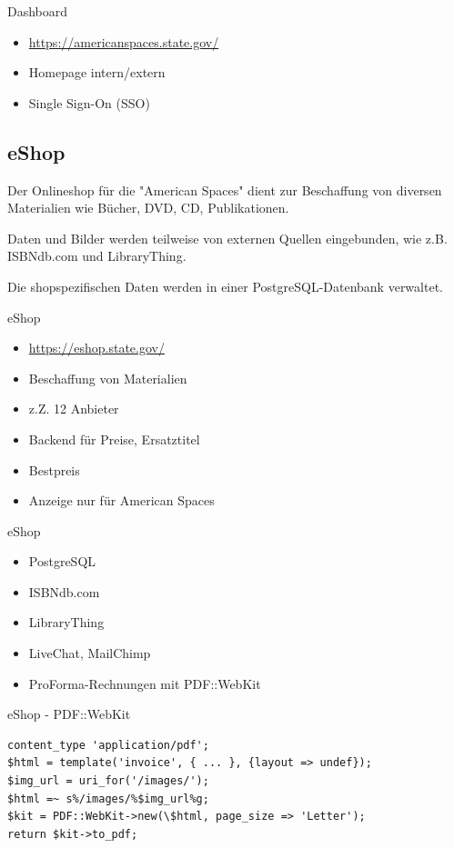 \begin{frame}{Dashboard}
\begin{itemize}
\item \url{https://americanspaces.state.gov/}
\item Homepage intern/extern
\item Single Sign-On (SSO)
\end{itemize}
\end{frame}
    
\subsection{eShop}

Der Onlineshop für die "American Spaces" dient zur Beschaffung von
diversen Materialien wie Bücher, DVD, CD, Publikationen.

Daten und Bilder werden teilweise von externen Quellen eingebunden,
wie z.B. ISBNdb.com und LibraryThing.

Die shopspezifischen Daten werden in einer PostgreSQL-Datenbank
verwaltet.

\begin{frame}{eShop}
\begin{itemize}
\item \url{https://eshop.state.gov/}
\item Beschaffung von Materialien
\item z.Z. 12 Anbieter
\item Backend für Preise, Ersatztitel
\item Bestpreis
\item Anzeige nur für American Spaces
\end{itemize}
\end{frame}

\begin{frame}{eShop}
\begin{itemize}
\item PostgreSQL
\item ISBNdb.com
\item LibraryThing
\item LiveChat, MailChimp
\item ProForma-Rechnungen mit PDF::WebKit
\end{itemize}
\end{frame}
    
\begin{frame}[fragile]{eShop - PDF::WebKit}
\begin{lstlisting}
content_type 'application/pdf';
$html = template('invoice', { ... }, {layout => undef});
$img_url = uri_for('/images/');
$html =~ s%/images/%$img_url%g;
$kit = PDF::WebKit->new(\$html, page_size => 'Letter');
return $kit->to_pdf;
\end{lstlisting}
\end{frame}

